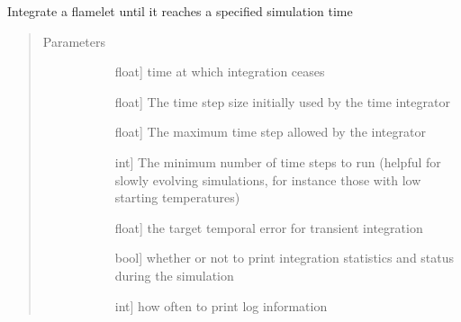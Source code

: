 \documentclass[letterpaper,10pt,english]{sphinxmanual}
\begin{document}
\begin{fulllineitems}
\begin{fulllineitems}
\begin{quote}
\begin{description}
\begin{description}
\end{description}

\end{description}\end{quote}

\end{fulllineitems}


\begin{fulllineitems}
\label{\detokenize{spitfire.chemistry.flamelet:spitfire.chemistry.flamelet.Flamelet.integrate_to_time}}
Integrate a flamelet until it reaches a specified simulation time
\begin{quote}\begin{description}
\item[{Parameters}] \leavevmode\begin{description}
\item[{}] \leavevmode{[}float{]}
time at which integration ceases

\item[{}] \leavevmode{[}float{]}
The time step size initially used by the time integrator

\item[{}] \leavevmode{[}float{]}
The maximum time step allowed by the integrator

\item[{}] \leavevmode{[}int{]}
The minimum number of time steps to run (helpful for slowly evolving simulations, for instance those with low starting temperatures)

\item[{}] \leavevmode{[}float{]}
the target temporal error for transient integration

\item[{}] \leavevmode{[}bool{]}
whether or not to print integration statistics and status during the simulation

\item[{}] \leavevmode{[}int{]}
how often to print log information


\end{description}
\end{description}
\end{quote}
\end{fulllineitems}
\end{fulllineitems}
\end{document}
